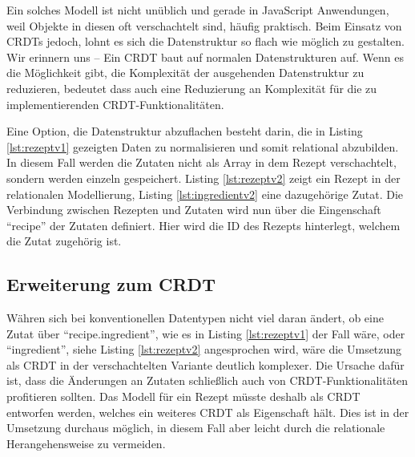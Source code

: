 \documentclass[a4paper, 12pt]{scrreprt}
\begin{document}

\begin{minipage}{\linewidth}
	
\end{minipage} 

Ein solches Modell ist nicht unüblich und gerade in JavaScript Anwendungen, weil Objekte in diesen oft verschachtelt sind, häufig praktisch. Beim Einsatz von CRDTs jedoch, lohnt es sich die Datenstruktur so flach wie möglich zu gestalten. Wir erinnern uns -- Ein CRDT baut auf normalen Datenstrukturen auf. Wenn es die Möglichkeit gibt, die Komplexität der ausgehenden Datenstruktur zu reduzieren, bedeutet dass auch eine Reduzierung an Komplexität für die zu implementierenden CRDT-Funktionalitäten.

Eine Option, die Datenstruktur abzuflachen besteht darin, die in Listing \ref{lst:rezeptv1} gezeigten Daten zu normalisieren und somit relational abzubilden. In diesem Fall werden die Zutaten nicht als Array in dem Rezept verschachtelt, sondern werden einzeln gespeichert. Listing \ref{lst:rezeptv2} zeigt ein Rezept in der relationalen Modellierung, Listing \ref{lst:ingredientv2} eine dazugehörige Zutat. Die Verbindung zwischen Rezepten und Zutaten wird nun über die Eingenschaft \enquote{recipe} der Zutaten definiert. Hier wird die ID des Rezepts hinterlegt, welchem die Zutat zugehörig ist.


\begin{minipage}{\linewidth}
	
\end{minipage}

\begin{minipage}{\linewidth}

\end{minipage}

\subsection{Erweiterung zum CRDT}

Währen sich bei konventionellen Datentypen nicht viel daran ändert, ob eine Zutat über \enquote{recipe.ingredient}, wie es in Listing \ref{lst:rezeptv1} der Fall wäre, oder \enquote{ingredient}, siehe Listing \ref{lst:rezeptv2} angesprochen wird, wäre die Umsetzung als CRDT in der verschachtelten Variante deutlich komplexer. Die Ursache dafür ist, dass die Änderungen an Zutaten schließlich auch von CRDT-Funktionalitäten profitieren sollten. Das Modell für ein Rezept müsste deshalb als CRDT entworfen werden, welches ein weiteres CRDT als Eigenschaft hält. Dies ist in der Umsetzung durchaus möglich, in diesem Fall aber leicht durch die relationale Herangehensweise zu vermeiden.
\end{document}
